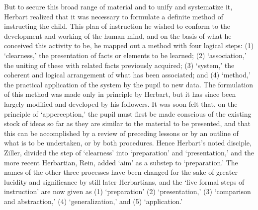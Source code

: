 \documentclass[]{book}
\begin{document}
But to secure this broad range of material and to unify and systematize it, Herbart realized that it was necessary to formulate a definite method of instructing the child. This plan of instruction he wished to conform to the development and working of the human mind, and on the basis of what he conceived this activity to be, he mapped out a method with four logical steps: (1) `clearness,' the presentation of facts or elements to be learned; (2) `association,' the uniting of these with related facts previously acquired; (3) `system,' the coherent and logical arrangement of what has been associated; and (4) `method,' the practical application of the system by the pupil to new data. The formulation of this method was made only in principle by Herbart, but it has since been largely modified and developed by his followers. It was soon felt that, on the principle of `apperception,' the pupil must first be made conscious of the existing stock of ideas so far as they are similar to the material to be presented, and that this can be accomplished by a review of preceding lessons or by an outline of what is to be undertaken, or by both procedures. Hence Herbart's noted disciple, Ziller, divided the step of `clearness' into `preparation' and `presentation,' and the more recent Herbartian, Rein, added `aim' as a substep to `preparation.' The names of the other three processes have been changed for the sake of greater lucidity and significance by still later Herbartians, and the `five formal steps of instruction' are now given as (1) `preparation' (2) `presentation,' (3) `comparison and abstraction,' (4) `generalization,' and (5) `application.'
\end{document}
